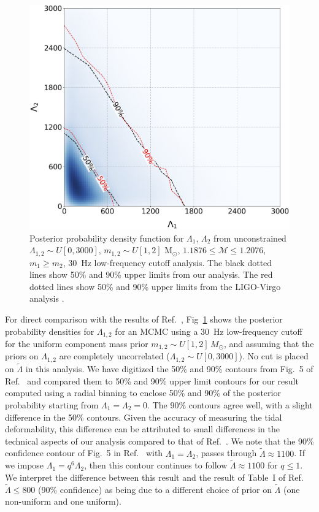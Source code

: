 \begin{figure}[b]
\includegraphics[width=\textwidth]{Figures/common-radius/lambda1_2_3x_ul.png}
\caption{Posterior probability density function for $\Lambda_1$, $\Lambda_2$ from unconstrained $\Lambda_{1,2} \sim U[0, 3000]$, $m_{1,2} \sim U[1, 2]$ M$_\odot$, $1.1876 \leq \mathcal{M} \leq 1.2076$, $m_1 \geq m_2$, 30~Hz low-frequency cutoff analysis. The black dotted lines show 50\% and 90\% upper limits from our analysis. The red dotted lines show 50\% and 90\% upper limits from the LIGO-Virgo analysis \cite{TheLIGOScientific:2017qsa}. } 
\label{fig:lv_compare}
\end{figure}

For direct comparison with the results of Ref.~\cite{TheLIGOScientific:2017qsa}, Fig~\ref{fig:lv_compare} shows the posterior probability densities for $\Lambda_{1,2}$ for an MCMC using a $30$~Hz low-frequency cutoff for the uniform component mass prior $m_{1,2} \sim U[1,2]\, M_\odot$, and assuming that the priors on $\Lambda_{1,2}$ are completely uncorrelated ($\Lambda_{1,2} \sim U[0,3000]$). No cut is placed on $\tilde\Lambda$ in this analysis. We have digitized the 50\% and 90\% contours from Fig.~5 of Ref.~\cite{TheLIGOScientific:2017qsa} and compared them to 50\% and 90\% upper limit contours for our result computed using a radial binning to enclose 50\% and 90\% of the posterior probability starting from $\Lambda_1 = \Lambda_2 = 0$. The 90\% contours agree well, with a slight difference in the 50\% contours. Given the accuracy of measuring the tidal deformability, this difference can 
be attributed to small differences in the technical aspects of our analysis compared to that of Ref.~\cite{TheLIGOScientific:2017qsa}. We note that the 90\% confidence contour of Fig.~5 in Ref.~\cite{TheLIGOScientific:2017qsa} with $\Lambda_1=\Lambda_2$, passes through $\tilde\Lambda \approx 1100$. If we impose $\Lambda_1=q^6 \Lambda_2$, then this contour continues to follow $\tilde\Lambda \approx 1100$ for $q \leq 1$. We interpret the difference between this result and the result of Table~I of Ref.~\cite{TheLIGOScientific:2017qsa} $\tilde\Lambda \le 800$ (90\% confidence) as being due to a different choice of prior on $\tilde\Lambda$ (one non-uniform and one uniform).

